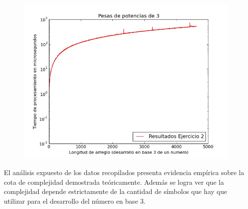     \renewcommand\constante{5}

	\begin{figure}[H]
      \begin{center}
        \includegraphics[width=0.7\columnwidth]{imagenes/ejercicio2.jpg}
        \caption{}
      \end{center}
  \end{figure}

El análisis expuesto de los datos recopilados presenta evidencia empírica sobre la cota de complejidad
demostrada teóricamente. Además se logra ver que la complejidad depende estrictamente de la cantidad
de símbolos que hay que utilizar para el desarrollo del número en base 3.